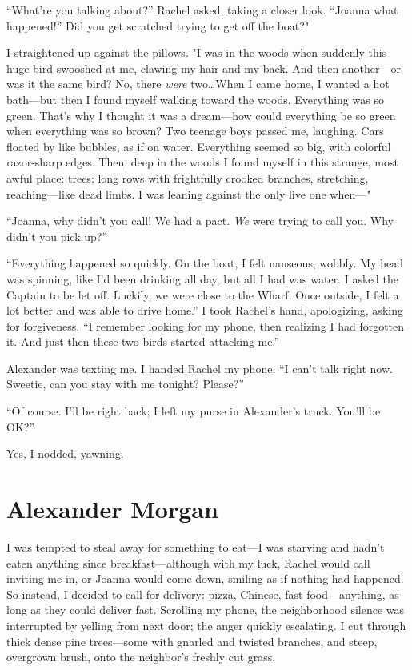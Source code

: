 ``What're you talking about?'' Rachel asked, taking a closer look.
``Joanna what happened!'' Did you get scratched trying to get off the
boat?"

I straightened up against the pillows. "I was in the woods when suddenly
this huge bird swooshed at me, clawing my hair and my back. And then
another---or was it the same bird? No, there \emph{were} two\ldots When
I came home, I wanted a hot bath---but then I found myself walking
toward the woods. Everything was so green. That's why I thought it was a
dream---how could everything be so green when everything was so brown?
Two teenage boys passed me, laughing. Cars floated by like bubbles, as
if on water. Everything seemed so big, with colorful razor-sharp edges.
Then, deep in the woods I found myself in this strange, most awful
place: trees; long rows with frightfully crooked branches, stretching,
reaching---like dead limbs. I was leaning against the only live one
when---"

``Joanna, why didn't you call! We had a pact. \emph{We} were trying to
call you. Why didn't you pick up?''

``Everything happened so quickly. On the boat, I felt nauseous, wobbly.
My head was spinning, like I'd been drinking all day, but all I had was
water. I asked the Captain to be let off. Luckily, we were close to the
Wharf. Once outside, I felt a lot better and was able to drive home.'' I
took Rachel's hand, apologizing, asking for forgiveness. ``I remember
looking for my phone, then realizing I had forgotten it. And just then
these two birds started attacking me.''

Alexander was texting me. I handed Rachel my phone. ``I can't talk right
now. Sweetie, can you stay with me tonight? Please?''

``Of course. I'll be right back; I left my purse in Alexander's truck.
You'll be OK?''

Yes, I nodded, yawning.

\chapter{Alexander Morgan}

\titlemark

I was tempted to steal away for something to eat---I was starving and
hadn't eaten anything since breakfast---although with my luck, Rachel
would call inviting me in, or Joanna would come down, smiling as if
nothing had happened. So instead, I decided to call for delivery: pizza,
Chinese, fast food---anything, as long as they could deliver fast.
Scrolling my phone, the neighborhood silence was interrupted by yelling
from next door; the anger quickly escalating. I cut through thick dense
pine trees---some with gnarled and twisted branches, and steep,
overgrown brush, onto the neighbor's freshly cut grass.

